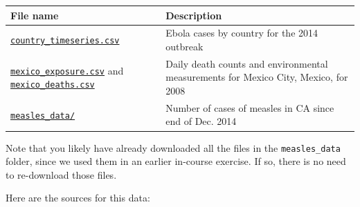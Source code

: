 \documentclass[]{book}
\begin{document}
\begin{longtable}[c]{@{}ll@{}}
\toprule
\begin{minipage}[b]{0.27\columnwidth}\raggedright\strut
File name
\strut\end{minipage} &
\begin{minipage}[b]{0.63\columnwidth}\raggedright\strut
Description
\strut\end{minipage}\tabularnewline
\midrule
\endhead
\begin{minipage}[t]{0.27\columnwidth}\raggedright\strut
\href{https://github.com/geanders/RProgrammingForResearch/raw/master/data/country_timeseries.csv}{\texttt{country\_timeseries.csv}}
\strut\end{minipage} &
\begin{minipage}[t]{0.63\columnwidth}\raggedright\strut
Ebola cases by country for the 2014 outbreak
\strut\end{minipage}\tabularnewline
\begin{minipage}[t]{0.27\columnwidth}\raggedright\strut
\href{https://github.com/geanders/RProgrammingForResearch/raw/master/data/mexico_exposure.csv}{\texttt{mexico\_exposure.csv}}
and
\href{https://github.com/geanders/RProgrammingForResearch/raw/master/data/mexico_deaths.csv}{\texttt{mexico\_deaths.csv}}
\strut\end{minipage} &
\begin{minipage}[t]{0.63\columnwidth}\raggedright\strut
Daily death counts and environmental measurements for Mexico City,
Mexico, for 2008
\strut\end{minipage}\tabularnewline
\begin{minipage}[t]{0.27\columnwidth}\raggedright\strut
\href{https://github.com/geanders/RProgrammingForResearch/tree/master/data/measles_data}{\texttt{measles\_data/}}
\strut\end{minipage} &
\begin{minipage}[t]{0.63\columnwidth}\raggedright\strut
Number of cases of measles in CA since end of Dec. 2014
\strut\end{minipage}\tabularnewline
\bottomrule
\end{longtable}

Note that you likely have already downloaded all the files in the
\texttt{measles\_data} folder, since we used them in an earlier
in-course exercise. If so, there is no need to re-download those files.

Here are the sources for this data:
\end{document}
